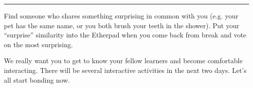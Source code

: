 \begin{center}
\rule{3in}{0.4pt}
\end{center}

Find someone who shares something surprising in common with you (e.g. your pet has the same name,
or you both brush your teeth in the shower). Put your ``surprise'' similarity into the Etherpad when
you come back from break and vote on the most surprising.

We really want you to get to know your fellow learners and become comfortable interacting. There
will be several interactive activities in the next two days. Let's all start bonding now.
